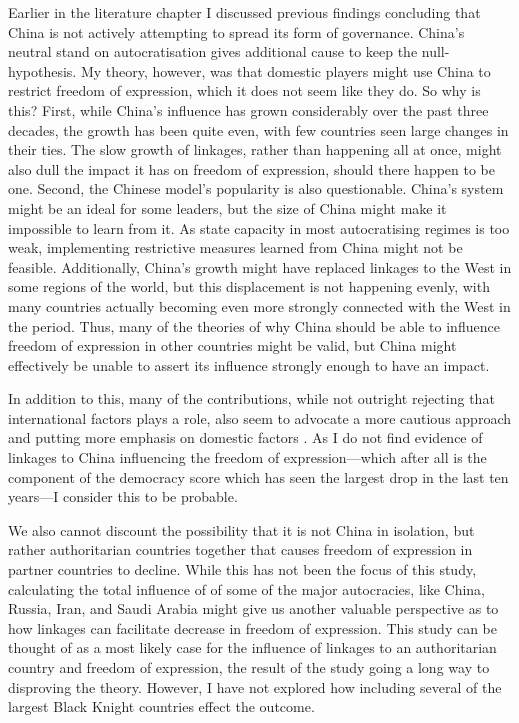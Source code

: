 Earlier in the literature chapter I discussed previous findings concluding that China is not actively attempting to spread its form of governance. China's neutral stand on autocratisation gives additional cause to keep the null-hypothesis. My theory, however, was that domestic players might use China to restrict freedom of expression, which it does not seem like they do. So why is this? First, while China's influence has grown considerably over the past three decades, the growth has been quite even, with few countries seen large changes in their ties. The slow growth of linkages, rather than happening all at once, might also dull the impact it has on freedom of expression, should there happen to be one. Second, the Chinese model's popularity is also questionable. China's system might be an ideal for some leaders, but the size of China might make it impossible to learn from it. As state capacity in most autocratising regimes is too weak, implementing restrictive measures learned from China might not be feasible. Additionally, China's growth might have replaced linkages to the West in some regions of the world, but this displacement is not happening evenly, with many countries actually becoming even more strongly connected with the West in the period. Thus, many of the theories of why China should be able to influence freedom of expression in other countries might be valid, but China might effectively be unable to assert its influence strongly enough to have an impact.

In addition to this, many of the contributions, while not outright rejecting that international factors plays a role, also seem to advocate a more cautious approach and putting more emphasis on domestic factors \citep{bader_china_2015, buzogany_illiberal_2017, risse_democracy_2015}. As I do not find evidence of linkages to China influencing the freedom of expression---which after all is the component of the democracy score which has seen the largest drop in the last ten years---I consider this to be probable. 

We also cannot discount the possibility that it is not China in isolation, but rather authoritarian countries together that causes freedom of expression in partner countries to decline. While this has not been the focus of this study, calculating the total influence of of some of the major autocracies, like China, Russia, Iran, and Saudi Arabia might give us another valuable perspective as to how linkages can facilitate decrease in freedom of expression. This study can be thought of as a most likely case for the influence of linkages to an authoritarian country and freedom of expression, the result of the study going a long way to disproving the theory. However, I have not explored how including several of the largest Black Knight countries effect the outcome. 

